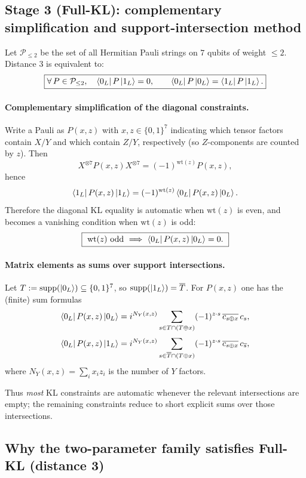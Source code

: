 \documentclass[11pt]{article}
\begin{document}
\subsection{Stage 3 (Full-KL): complementary simplification and support-intersection method}

Let $\mathcal{P}_{\le 2}$ be the set of all Hermitian Pauli strings on $7$ qubits of weight $\le 2$.
Distance $3$ is equivalent to:
\[
\boxed{
\forall\,P\in\mathcal{P}_{\le 2},\quad
\bra{0_L}P\ket{1_L}=0,\qquad \bra{0_L}P\ket{0_L}=\bra{1_L}P\ket{1_L}.
}
\]

\paragraph{Complementary simplification of the diagonal constraints.}
Write a Pauli as $P(x,z)$ with $x,z\in\{0,1\}^7$ indicating which tensor factors contain $X/Y$
and which contain $Z/Y$, respectively (so $Z$-components are counted by $z$).
Then
\[
X^{\otimes 7} P(x,z) X^{\otimes 7} = (-1)^{\mathrm{wt}(z)} P(x,z),
\]
hence
\[
\bra{1_L}P(x,z)\ket{1_L}=(-1)^{\mathrm{wt}(z)}\bra{0_L}P(x,z)\ket{0_L}.
\]
Therefore the diagonal KL equality is automatic when $\mathrm{wt}(z)$ is even, and becomes a vanishing
condition when $\mathrm{wt}(z)$ is odd:
\[
\boxed{\ \mathrm{wt}(z)\ \text{odd}\ \Longrightarrow\ \bra{0_L}P(x,z)\ket{0_L}=0.\ }
\]

\paragraph{Matrix elements as sums over support intersections.}
Let $T:=\mathrm{supp}(\ket{0_L})\subseteq\{0,1\}^7$, so $\mathrm{supp}(\ket{1_L})=\overline{T}$.
For $P(x,z)$ one has the (finite) sum formulas
\[
\bra{0_L}P(x,z)\ket{0_L}
=i^{N_Y(x,z)}\sum_{s\in T\cap (T\oplus x)}(-1)^{z\cdot s}\,\overline{c_{s\oplus x}}\,c_s,
\]
\[
\bra{0_L}P(x,z)\ket{1_L}
=i^{N_Y(x,z)}\sum_{s\in \overline{T}\cap (T\oplus x)}(-1)^{z\cdot s}\,\overline{c_{s\oplus x}}\,c_{\overline{s}},
\]
where $N_Y(x,z)=\sum_i x_i z_i$ is the number of $Y$ factors.

Thus \emph{most} KL constraints are automatic whenever the relevant intersections are empty; the remaining
constraints reduce to short explicit sums over those intersections.

\subsection{Why the two-parameter family satisfies Full-KL (distance 3)}
\end{document}

